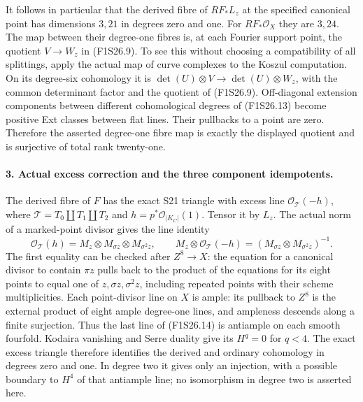 It follows in particular that the derived fibre of
$RF_*L_z$ at the specified canonical point has dimensions
$3,21$ in degrees zero and one. For $RF_*\mathcal O_X$ they
are $3,24$. The map between their degree-one fibres is,
at each Fourier support point, the quotient $V\to W_z$ in
(F1S26.9). To see this without choosing a compatibility of
all splittings, apply the actual map of curve complexes to
the Koszul computation. On its degree-six cohomology it is
$\det(U)\otimes V\to\det(U)\otimes W_z$, with the common
determinant factor and the quotient of (F1S26.9). Off-diagonal
extension components between different cohomological degrees
of (F1S26.13) become positive Ext classes between flat lines.
Their pullbacks to a point are zero. Therefore the asserted
degree-one fibre map is exactly the displayed quotient and
is surjective of total rank twenty-one.

\paragraph{3. Actual excess correction and the three component idempotents.}
The derived fibre of $F$ has the exact S21 triangle with
excess line $\mathcal O_{\mathcal T}(-h)$, where
$\mathcal T=T_0\amalg T_1\amalg T_2$ and
$h=p^*\mathcal O_{|K_C|}(1)$. Tensor it by $L_z$. The
actual norm of a marked-point divisor gives the line identity
\[
 \mathcal O_{\mathcal T}(h)
  =M_z\otimes M_{\sigma z}\otimes M_{\sigma^2z},
 \qquad
 M_z\otimes\mathcal O_{\mathcal T}(-h)
       =(M_{\sigma z}\otimes M_{\sigma^2z})^{-1}.
 \tag{F1S26.14}
\]
The first equality can be checked after $Z^8\to X$: the
equation for a canonical divisor to contain $\pi z$ pulls
back to the product of the equations for its eight points
to equal one of $z,\sigma z,\sigma^2z$, including repeated
points with their scheme multiplicities.
Each point-divisor line on $X$ is ample: its pullback to
$Z^8$ is the external product of eight ample degree-one
lines, and ampleness descends along a finite surjection.
Thus the last line of (F1S26.14) is antiample on each smooth
fourfold. Kodaira vanishing and Serre duality give its
$H^q=0$ for $q<4$. The exact excess triangle therefore
identifies the derived and ordinary cohomology in degrees
zero and one. In degree two it gives only an injection,
with a possible boundary to $H^4$ of that antiample line;
no isomorphism in degree two is asserted here.

